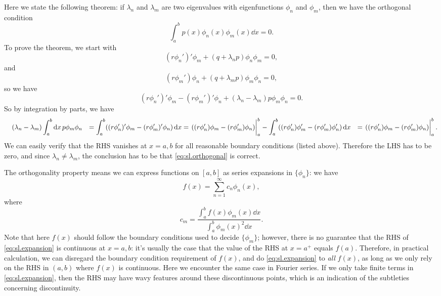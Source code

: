 \documentclass[hyperref, a4paper]{article}
\def\\{}%
\begin{document}
Here we state the following theorem:
if $\lambda_n$ and $\lambda_m$ are two eigenvalues with eigenfunctions $\phi_n$ and $\phi_m$,
then we have the orthogonal condition
\begin{equation}
    \int_{a}^{b} p(x) \phi_n(x) \phi_m(x) \dd{x} = 0.
    \label{eq:sl.orthogonal}
\end{equation}
To prove the theorem, we start with 
\[
    (r \phi_n')' \phi_m + (q + \lambda_n p) \phi_n \phi_m = 0,
\]
and 
\[
    (r \phi_m') \phi_n + (q + \lambda_m p) \phi_m \phi_n = 0,
\]
so we have 
\[
    (r \phi_n')' \phi_m 
    - (r \phi_m')' \phi_n 
    + (\lambda_n - \lambda_m) p \phi_m \phi_n = 0.
\]
So by integration by parts, we have 
\[
    \begin{aligned}
        &\quad (\lambda_n - \lambda_m) \int_{a}^{b} \dd{x} p \phi_m \phi_n   \\
        &= \int_{a}^{b} ((r \phi_n')' \phi_m 
        - (r \phi_m')' \phi_n ) \dd{x} \\
        &= \eval{
            ((r \phi_n') \phi_m 
            - (r \phi_m') \phi_n )
        }_a^b - 
        \int_{a}^{b} ((r \phi_n') \phi_m'
        - (r \phi_m') \phi_n' ) \dd{x} \\
        &= \eval{
            ((r \phi_n') \phi_m 
            - (r \phi_m') \phi_n )
        }_a^b.
    \end{aligned}
\]
We can easily verify that the RHS vanishes at $x = a, b$
for all reasonable boundary conditions 
(listed above). 
Therefore the LHS has to be zero, 
and since $\lambda_n \neq \lambda_m$,
the conclusion has to be that 
\eqref{eq:sl.orthogonal} is correct. 

The orthogonality property means we can express functions on $[a, b]$ 
as series expansions in $\{\phi_n\}$: 
we have 
\begin{equation}
    f(x) = \sum_{n=1}^{\infty} c_n \phi_n(x),
    \label{eq:sl.expansion}
\end{equation}
where 
\begin{equation}
    c_m = \frac{
        \int_{a}^{b} f(x) \phi_m(x) \dd{x}
    }{
        \int_{a}^{b} \phi_m(x)^2 \dd{x}
    }.
\end{equation}
Note that here $f(x)$ should follow the boundary conditions used to decide $\{\phi_m\}$;
however, there is no guarantee that 
the RHS of \eqref{eq:sl.expansion} is continuous at $x = a, b$:
it's usually the case that the value of the RHS at $x = a^+$
equals $f(a)$.
Therefore, in practical calculation, 
we can disregard the boundary condition requirement of $f(x)$,
and do \eqref{eq:sl.expansion} to \emph{all} $f(x)$,
as long as we only rely on the RHS 
in $(a, b)$ where $f(x)$ is continuous.
Here we encounter the same case in Fourier series.
If we only take finite terms in \eqref{eq:sl.expansion}, 
then the RHS may have wavy features around these discontinuous points, 
which is an indication of the subtleties concerning discontinuity.
\end{document}
